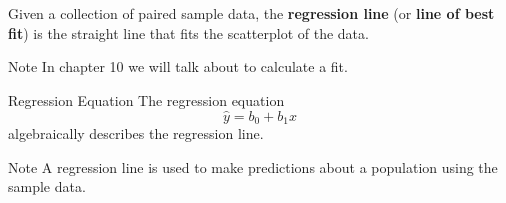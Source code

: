\documentclass{beamer}
\begin{document}
\begin{frame}
\begin{definition}
Given a collection of paired sample data, the \textbf{regression line} (or \textbf{line of best fit}) is the straight line that  fits the scatterplot of the data.
\end{definition}\pause

\begin{block}{Note}
In chapter 10 we will talk about to calculate a  fit.
\end{block}\pause

\begin{block}{Regression Equation}
The regression equation
\begin{equation*}
\hat{y}=b_0+b_1 x
\end{equation*}
algebraically describes the regression line.
\end{block}\pause

\begin{block}{Note}
A regression line is used to make predictions about a population using the sample data.
\end{block}
\end{frame}
\end{document}
